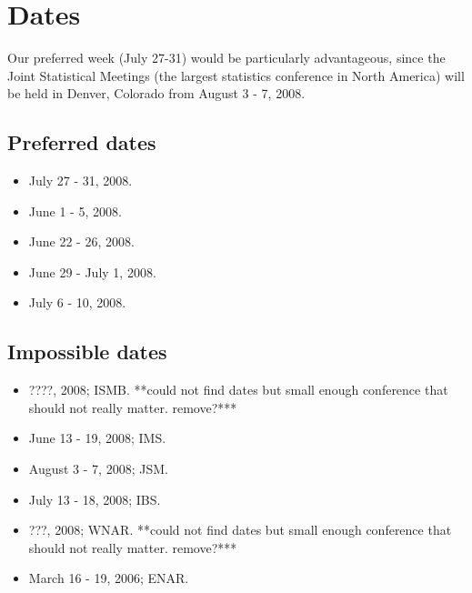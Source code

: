 \documentclass[12pt]{amsart}
\begin{document}
\section*{Dates}

Our preferred week (July 27-31) would be particularly
advantageous, since the Joint Statistical Meetings (the largest
statistics conference in North America) will be held in Denver, Colorado
from August 3 - 7, 2008.

\subsection*{Preferred dates}

\begin{itemize}
\item July 27 - 31, 2008.
\item June 1 - 5, 2008.
\item June 22 - 26, 2008.
\item June 29 - July 1, 2008.
\item July 6 - 10, 2008.
\end{itemize}

\subsection*{Impossible dates}

\begin{itemize}
\item ????, 2008; ISMB. **could not find dates but small enough conference that should not really matter. remove?***
\item June 13 - 19, 2008; IMS.
\item August 3 - 7, 2008; JSM.
\item July 13 - 18, 2008; IBS.
\item ???, 2008; WNAR. **could not find dates but small enough conference that should not really matter. remove?***
\item March 16 - 19, 2006; ENAR.
\end{itemize}
\end{document}
